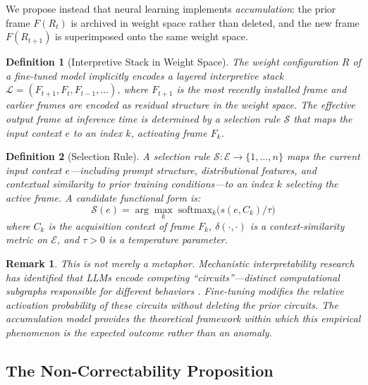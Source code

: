 \documentclass[12pt]{article}
\newtheorem{definition}{Definition}
\newtheorem{remark}{Remark}
\begin{document}
We propose instead that neural learning implements
\emph{accumulation}: the prior frame $F(R_t)$ is archived in weight
space rather than deleted, and the new frame $F(R_{t+1})$ is
superimposed onto the same weight space.

\begin{definition}[Interpretive Stack in Weight Space]
The weight configuration $R$ of a fine-tuned model implicitly
encodes a layered interpretive stack
$\mathcal{L} = (F_{t+1}, F_t, F_{t-1}, \ldots)$,
where $F_{t+1}$ is the most recently installed frame and earlier
frames are encoded as residual structure in the weight space.
The effective output frame at inference time is determined by a
\emph{selection rule} $\mathcal{S}$ that maps the input context
$e$ to an index $k$, activating frame $F_k$.
\end{definition}

\begin{definition}[Selection Rule]
A selection rule $\mathcal{S}: \mathcal{E} \to \{1, \ldots, n\}$
maps the current input context $e$---including prompt structure,
distributional features, and contextual similarity to prior
training conditions---to an index $k$ selecting the active frame.
A candidate functional form is:
\[
\mathcal{S}(e) = \arg\max_k \; \mathrm{softmax}_k
\bigl(s(e, C_k) / \tau\bigr)
\]
where $C_k$ is the acquisition context of frame $F_k$,
$\delta(\cdot, \cdot)$ is a context-similarity metric on
$\mathcal{E}$, and $\tau > 0$ is a temperature parameter.
\end{definition}

\begin{remark}
This is not merely a metaphor. Mechanistic interpretability
research has identified that LLMs encode competing
``circuits''---distinct computational subgraphs responsible
for different behaviors \cite{anthropic2025circuit,
conmy2023towards}. Fine-tuning modifies the relative activation
probability of these circuits without deleting the prior circuits.
The accumulation model provides the theoretical framework within
which this empirical phenomenon is the expected outcome rather
than an anomaly.
\end{remark}

\subsection{The Non-Correctability Proposition}
\end{document}
